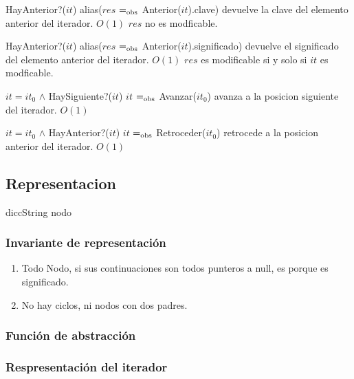   {HayAnterior?($it$)}
  {alias($res$ $=_{\mathrm{obs}}$ Anterior($it$).clave)}
  {devuelve la clave del elemento anterior del iterador.}
  {$O(1)$}
  {$res$ no es modficable.}

  {HayAnterior?($it$)}
  {alias($res$ $=_{\mathrm{obs}}$ Anterior($it$).significado)}
  {devuelve el significado del elemento anterior del iterador.}
  {$O(1)$}
  {$res$ es modificable si y solo si $it$ es modficable.}


  {$it = it_0$ $\land$ HaySiguiente?($it$)}
  {$it$ $=_{\mathrm{obs}}$ Avanzar($it_0$)}
  {avanza a la posicion siguiente del iterador.}
  {$O(1)$}
  {}

  {$it = it_0$ $\land$ HayAnterior?($it$)}
  {$it$ $=_{\mathrm{obs}}$ Retroceder($it_0$)}
  {retrocede a la posicion anterior del iterador.}
  {$O(1)$}
  {}



\subsection{Representacion}
diccString
nodo


\subsubsection*{Invariante de representación}


\begin{enumerate}
\item Todo Nodo, si sus continuaciones son todos punteros a null, es porque es significado.
\item No hay ciclos, ni nodos con dos padres.
\end{enumerate}

\subsubsection*{Función de abstracción}

\subsubsection*{Respresentación del iterador}

